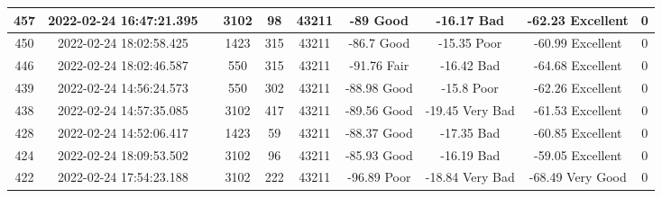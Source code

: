 \begin{longtable*}{|c|c|c|c|c|c|c|c|c|c|}
457&2022-02-24 16:47:21.395&&3102&98&43211& -89       Good        & -16.17    Bad         & -62.23    Excellent   & 0\\\hline
{}450&2022-02-24 18:02:58.425&&1423&315&43211& -86.7     Good        & -15.35    Poor        & -60.99    Excellent   & 0\\\hline
{}446&2022-02-24 18:02:46.587&&550&315&43211& -91.76    Fair        & -16.42    Bad         & -64.68    Excellent   & 0\\\hline
{}439&2022-02-24 14:56:24.573&&550&302&43211& -88.98    Good        & -15.8     Poor        & -62.26    Excellent   & 0\\\hline
{}438&2022-02-24 14:57:35.085&&3102&417&43211& -89.56    Good        & -19.45    Very Bad    & -61.53    Excellent   & 0\\\hline
{}428&2022-02-24 14:52:06.417&&1423&59&43211& -88.37    Good        & -17.35    Bad         & -60.85    Excellent   & 0\\\hline
{}424&2022-02-24 18:09:53.502&&3102&96&43211& -85.93    Good        & -16.19    Bad         & -59.05    Excellent   & 0\\\hline
{}422&2022-02-24 17:54:23.188&&3102&222&43211& -96.89    Poor        & -18.84    Very Bad    & -68.49    Very Good   & 0\\\hline

\end{longtable*}
